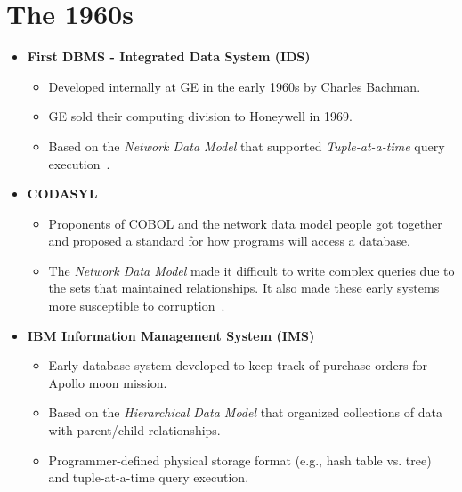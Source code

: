 \documentclass[11pt]{article}
\begin{document}
\section{The 1960s}
\begin{itemize}
    \item \textbf{First DBMS - Integrated Data System (IDS)}~\cite{bachman-interview,haigh16}
    \begin{itemize}
        \item
        Developed internally at GE in the early 1960s by Charles Bachman.
        
        \item
        GE sold their computing division to Honeywell in 1969.
        
        \item
        Based on the \textit{Network Data Model} that supported 
        \textit{Tuple-at-a-time} query execution~\cite{bachman66}.
    \end{itemize}
    
    \item \textbf{CODASYL}~\cite{taylor76}
    \begin{itemize}
        \item
        Proponents of COBOL and the network data model people got together and proposed a standard 
        for how programs will access a database.
        
        \item
        The \textit{Network Data Model} made it difficult to write complex queries due to the sets 
        that maintained relationships. It also made these early systems more susceptible to 
        corruption~\cite{stonebraker2005goes}.
    \end{itemize}
    
    \item \textbf{IBM Information Management System (IMS)}~\cite{klein12}
    \begin{itemize}
        \item
        Early database system developed to keep track of purchase orders for Apollo moon mission.
        
        \item
        Based on the \textit{Hierarchical Data Model} that organized collections of data with
        parent/child relationships.
        
        \item
        Programmer-defined physical storage format (e.g., hash table vs. tree) and tuple-at-a-time 
        query execution.
    \end{itemize}
\end{itemize}
\end{document}
